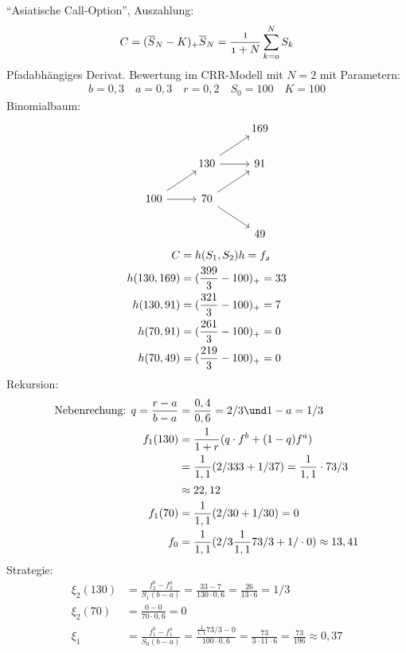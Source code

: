 \begin{*example}
	``Asiatische Call-Option'', Auszahlung:
	\begin{align*}
		C=(\overline{S}_N - K)_+ \mit \overline{S}_N = \frac{1}{1+N}\sum_{k=0}^N S_k
	\end{align*}
	Pfadabhängiges Derivat. Bewertung im CRR-Modell mit $N=2$ mit Parametern:
	\begin{align*}
		b=0,3\quad a=0,3 \quad r = 0,2\quad S_0 = 100\quad K = 100
	\end{align*}
	Binomialbaum:
	\[
		\begin{tikzcd}
			&                          & 169 \\
			& 130 \arrow[ru] \arrow[r] & 91  \\
			100 \arrow[ru] \arrow[r] & 70 \arrow[ru] \arrow[rd] &     \\
			&                          & 49 
		\end{tikzcd}
	\]
	\begin{align*}
		C&=h(S_1,S_2) \mit h = f_2\\
		h(130,169) &= (\frac{399}{3}-100)_+ = 33\\
		h(130,91) &= (\frac{321}{3}-100)_+ = 7\\
		h(70,91) &= (\frac{261}{3}-100)_+ = 0\\
		h(70,49) &= (\frac{219}{3}-100)_+ = 0
	\end{align*}
	Rekursion:\\
	\begin{align*}
		\text{Nebenrechung: }q = \frac{r-a}{b-a} &= \frac{0,4}{0,6} = 2/3 \und 1-a = 1/3\\
		f_1(130) &= \frac{1}{1+r}(q \cdot f^b + (1-q)f^a)\\
		&= \frac{1}{1,1}(2/3 33 + 1/3 7) = \frac{1}{1,1}\cdot 73/3\\
		&\approx 22,12\\
		f_1(70) &= \frac{1}{1,1}(2/3 0 + 1/3 0) = 0\\
		f_0 &= \frac{1}{1,1}(2/3 \frac{1}{1,1} 73/3 + 1/\cdot 0) \approx 13,41
	\end{align*}
	Strategie:
	\begin{align*}
		\xi_2(130) &= \frac{f_2^b - f_2^a}{S_1 (b-a)} = \frac{33-7}{130\cdot 0,6} = \frac{26}{13\cdot 6} = 1/3\\
		\xi_2(70) &= \frac{0-0}{70\cdot 0,6} = 0\\
		\xi_1 &= \frac{f_1^b - f_1^a}{S_0(b-a)} = \frac{\frac{1}{1,1}73/3 - 0}{100\cdot 0,6} = \frac{73}{3\cdot 11 \cdot 6} = \frac{73}{196} \approx 0,37 
	\end{align*}
\end{*example}
